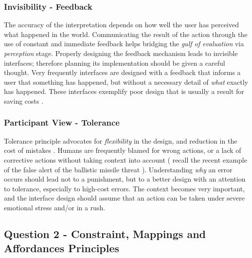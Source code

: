 \documentclass[12pt,letterpaper]{article}
\begin{document}
\subsubsection*{Invisibility - Feedback}
The accuracy of the interpretation depends on how well the user has perceived what happened in the world. Communicating the result of the action through the use of constant and immediate feedback helps bridging the \textit{gulf of evaluation} via \textit{perception} stage. Properly designing the feedback mechanism leads to invisible interfaces; therefore planning its implementation should be given a careful thought. Very frequently interfaces are designed with a feedback that informs a user that something has happened, but without a necessary detail of \textit{what} exactly has happened. These interfaces exemplify poor design that is usually a result for saving costs \cite{norman2013design}. 

\subsubsection*{Participant View - Tolerance}
Tolerance principle advocates for \textit{flexibility} in the design, and reduction in the cost of mistakes \cite{wiki:principles}. Humans are frequently blamed for wrong actions, or a lack of corrective actions without taking context into account ( recall the recent example of the false alert of the ballistic missile threat \cite{blog:fastcompany_hawaii}). Understanding \textit{why} an error occurs should lead not to a punishment, but to a better design with an attention to tolerance, especially to high-cost errors. The context becomes very important, and the interface design should assume that an action can be taken under severe emotional stress and/or in a rush.   

\subsection*{Question 2 - Constraint, Mappings and Affordances Principles}
\end{document}
